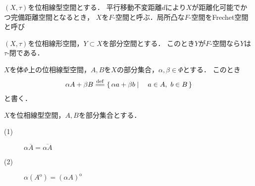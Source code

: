	\begin{screen}
		\begin{dfn}
			$(X,\tau)$を位相線型空間とする．
			平行移動不変距離$d$により$X$が距離化可能でかつ完備距離空間となるとき，
			$X$を$F$-空間と呼ぶ．局所凸な$F$-空間をFrechet空間と呼び
		\end{dfn}
	\end{screen}
	
	\begin{screen}
		\begin{thm}
			$(X,\tau)$を位相線形空間，$Y \subset X$を部分空間とする．
			このとき$Y$が$F$-空間なら$Y$は$\tau$-閉である．
		\end{thm}
	\end{screen}
	
	\begin{prf}
	\end{prf}
	
	\begin{screen}
		\begin{dfn}[集合の線型演算]
			$X$を体$\Phi$上の位相線型空間，$A,B$を$X$の部分集合，$\alpha,\beta \in \Phi$とする．
			このとき
			\begin{align}
				\alpha A + \beta B \defeq \Set{\alpha a + \beta b}{a \in A,\ b \in B}
			\end{align}
			と書く．
		\end{dfn}
	\end{screen}
	
	\begin{screen}
		\begin{thm}
			$X$を位相線型空間，$A,B$を部分集合とする．
			\begin{description}
				\item[(1)] $\alpha \overline{A} = \overline{\alpha A}$
				\item[(2)] $\alpha (A^{\mathrm{o}}) = (\alpha A)^{\mathrm{o}}$
			\end{description}
		\end{thm}
	\end{screen}
	
